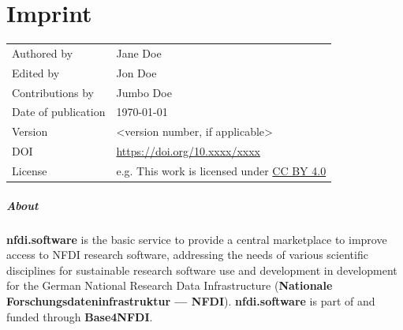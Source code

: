 \documentclass[headsepline,titlepage,twoside,12pt,toc=flat,headings=normal]{scrreprt}
\author{\theauthor}
\date{\thedate}
\title{\thetitle}
\subtitle{Subtitle (optional)}
\renewcommand{\emph}[1]{\textcolor{nfdiblue}{\textbf{#1}}}
\newcommand{\thetitle}{Title}
\newcommand{\thedate}{\today}
\newcommand{\theauthor}{Jane Doe}
\newcommand{\theeditor}{Jon Doe}
\newcommand{\thecontributor}{Jumbo Doe}
\begin{document}
\allowdisplaybreaks%

\maketitle

\chapter*{Imprint}\label{ch:imprint}

\begin{tabular}{ll}
Authored by			&\theauthor\\
Edited by			&\theeditor\\
Contributions by	&\thecontributor\\
Date of publication	&\thedate\\
Version				&<version number, if applicable>\\
DOI					&\url{https://doi.org/10.xxxx/xxxx}\\
License				&e.g. This work is licensed under \href{https://creativecommons.org/licenses/by/4.0/}{CC BY 4.0}\\
\end{tabular}

\paragraph{About}
\emph{nfdi.software} is the basic service to provide a central marketplace to improve access to NFDI research software,
addressing the needs of various scientific disciplines for sustainable research software use and development in development for the German National Research Data Infrastructure (\emph{Nationale Forschungsdateninfrastruktur --- NFDI}).
\emph{nfdi.software} is part of and funded through \emph{Base4NFDI}.
\end{document}
